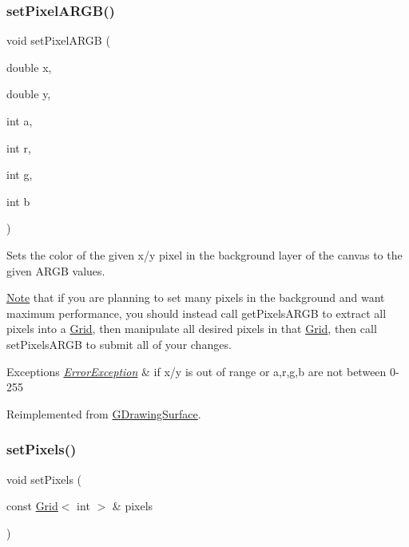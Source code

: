 \mbox{\label{classGCanvas_a3de28156839da845f8d24503c9a3b111}} 
\subsubsection{\texorpdfstring{set\+Pixel\+A\+R\+G\+B()}{setPixelARGB()}\hspace{0.1cm}{\footnotesize\ttfamily [2/2]}}
{\footnotesize\ttfamily void set\+Pixel\+A\+R\+GB (\begin{DoxyParamCaption}\item[{double}]{x,  }\item[{double}]{y,  }\item[{int}]{a,  }\item[{int}]{r,  }\item[{int}]{g,  }\item[{int}]{b }\end{DoxyParamCaption})\hspace{0.3cm}{\ttfamily [virtual]}}



Sets the color of the given x/y pixel in the background layer of the canvas to the given A\+R\+GB values. 

\mbox{\hyperlink{classNote}{Note}} that if you are planning to set many pixels in the background and want maximum performance, you should instead call get\+Pixels\+A\+R\+GB to extract all pixels into a \mbox{\hyperlink{classGrid}{Grid}}, then manipulate all desired pixels in that \mbox{\hyperlink{classGrid}{Grid}}, then call set\+Pixels\+A\+R\+GB to submit all of your changes.


\begin{DoxyExceptions}{Exceptions}
{\em \mbox{\hyperlink{classErrorException}{Error\+Exception}}} & if x/y is out of range or a,r,g,b are not between 0-\/255 \\
\hline
\end{DoxyExceptions}


Reimplemented from \mbox{\hyperlink{classGDrawingSurface_a62a8b1555ae3a073a84b0a1c071c65b1}{G\+Drawing\+Surface}}.

\mbox{\label{classGCanvas_a83fcae972f2677bf1ece054930f53162}} 
\subsubsection{\texorpdfstring{set\+Pixels()}{setPixels()}}
{\footnotesize\ttfamily void set\+Pixels (\begin{DoxyParamCaption}\item[{const \mbox{\hyperlink{classGrid}{Grid}}$<$ int $>$ \&}]{pixels }\end{DoxyParamCaption})\hspace{0.3cm}{\ttfamily [virtual]}}



